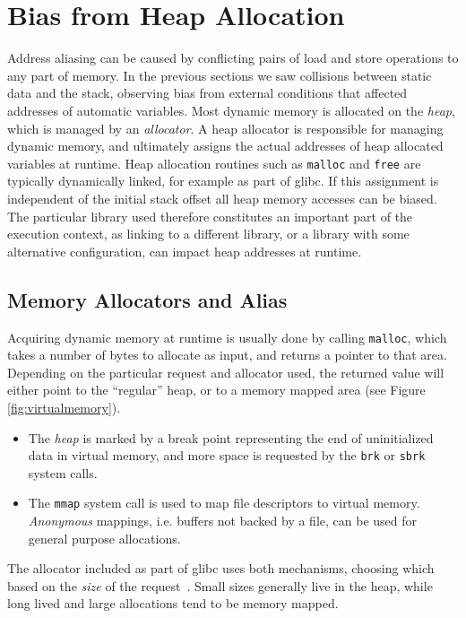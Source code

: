 \documentclass[10pt, conference, compsocconf]{IEEEtran}
\begin{document}
\section{Bias from Heap Allocation}
\label{sec:heap}
Address aliasing can be caused by conflicting pairs of load and store operations to any part of memory.
In the previous sections we saw collisions between static data and the stack, observing bias from external conditions that affected addresses of automatic variables.
Most dynamic memory is allocated on the \emph{heap}, which is managed by an \emph{allocator}.
A heap allocator is responsible for managing dynamic memory, and ultimately assigns the actual addresses of heap allocated variables at runtime.
Heap allocation routines such as \texttt{malloc} and \texttt{free} are typically dynamically linked, for example as part of glibc.
If this assignment is independent of the initial stack offset all heap memory accesses can be biased.
The particular library used therefore constitutes an important part of the execution context, as linking to a different library, or a library with some alternative configuration, can impact heap addresses at runtime.

\subsection{Memory Allocators and Alias}
Acquiring dynamic memory at runtime is usually done by calling \texttt{malloc}, which takes a number of bytes to allocate as input, and returns a pointer to that area.
Depending on the particular request and allocator used, the returned value will either point to the ``regular'' heap, or to a memory mapped area (see Figure \ref{fig:virtualmemory}).
\begin{itemize}
  \item The \emph{heap} is marked by a break point representing the end of uninitialized data in virtual memory, and more space is requested by the \texttt{brk} or \texttt{sbrk} system calls.
  \item The \texttt{mmap} system call is used to map file descriptors to virtual memory. \emph{Anonymous} mappings, i.e. buffers not backed by a file, can be used for general purpose allocations.
\end{itemize}
The allocator included as part of glibc uses both mechanisms, choosing which based on the \emph{size} of the request~\cite{GlibcManual}.
Small sizes generally live in the heap, while long lived and large allocations tend to be memory mapped.
\end{document}

